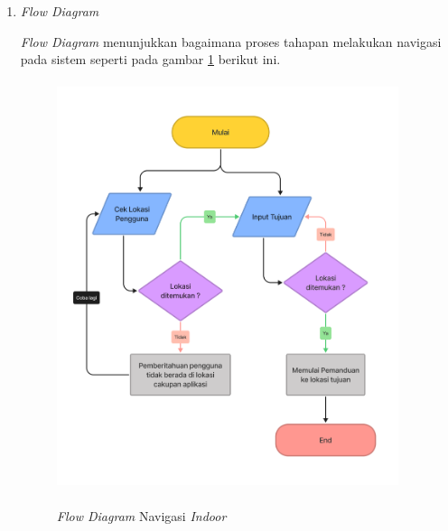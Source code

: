 \begin{enumerate}
\begin{enumerate}
\item \textit{Input} diterima dari pengguna setelah mengucapkan \textit{hotword}.

\item Pada proses 1 aplikasi dan perangkat akan memindai kekuatan sinyal BLE terdekat serta menentukan posisi pengguna.

\item Pada proses 2, setelah posisi pengguna ditentukan, aplikasi akan melakukan pengecekan \textit{input} dari pengguna pada \textit{database} lokasi menggunakan model yang telah tersedia oleh penelitian lainnya.

\item Pada proses 3, aplikasi akan memprediksi jarak tujuan serta rute terdekat menuju tujuan pengguna menggunakan algoritma kalman filter.

\item Hasil yang dihasilkan dari proses-proses sebelumnya berupa notifikasi dan vibrasi serta \textit{text-to-speech} atau berupa ucapan dari rute yang akan di tempuh oleh pengguna, seperti "Belok ke kanan dalam 5 langkah", "Telah sampai di tujuan , Ruangan Jurusan Informatika", dll.
\end{enumerate}

\item \textit{Flow Diagram}
\par \textit{Flow Diagram} menunjukkan bagaimana proses tahapan melakukan navigasi pada sistem seperti pada gambar \ref{img:flow_diagram_app} berikut ini.

\begin{figure}[H]
\centering
{\includegraphics [width = 10cm, height= 12cm]{gambar/bab3/flow_diagram_app}}
\caption{\textit{Flow Diagram} Navigasi \textit{Indoor}}
\label{img:flow_diagram_app}
\end{figure}


\end{enumerate}
